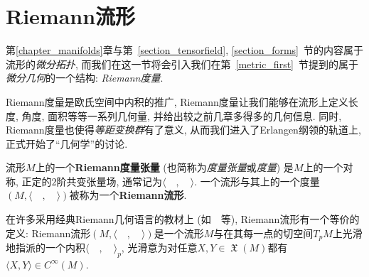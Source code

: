 \section{Riemann流形}
第\ref{chapter_manifolds}章与第~\ref{section_tensorfield}, \ref{section_forms}~节的内容属于流形的\textit{微分拓扑}, 而我们在这一节将会引入我们在第~\ref{metric_first}~节提到的属于\textit{微分几何}的一个结构: \textit{Riemann度量}.

Riemann度量是欧氏空间中内积的推广, Riemann度量让我们能够在流形上定义长度, 角度, 面积等等一系列几何量, 并给出较之前几章多得多的几何信息.
同时, Riemann度量也使得\textit{等距变换群}有了意义, 从而我们进入了Erlangen纲领的轨道上, 正式开始了``几何学''的讨论.

\begin{defn}
    流形$M$上的一个\textbf{Riemann度量张量} (也简称为\textit{度量张量}或\textit{度量}) 是$M$上的一个对称, 正定的$2$阶共变张量场, 通常记为$\langle\quad,\quad\rangle$.
    一个流形与其上的一个度量$(M,\langle\quad,\quad\rangle)$被称为一个\textbf{Riemann流形}.
\end{defn}

\begin{rem}
    在许多采用经典Riemann几何语言的教材上 (如~\parencites{doCarmo_DiffForm}{Tu_DiffGeo}~等), Riemann流形有一个等价的定义:
    Riemann流形$(M,\langle\quad,\quad\rangle)$是一个流形$M$与在其每一点的切空间$T_pM$上光滑地指派的一个内积$\langle\quad,\quad\rangle_p$, 光滑意为对任意$X,Y\in\mfrakX(M)$都有$\langle X,Y\rangle\in C^\infty(M)$.
\end{rem}
